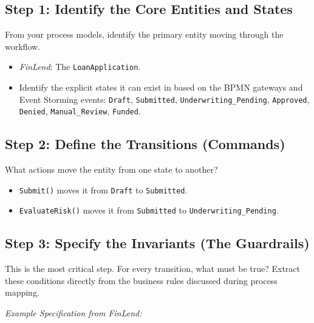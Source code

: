 \documentclass[
  11pt,
  openany,
  oneside]{book}
\providecommand{\tightlist}{%
  \setlength{\itemsep}{0pt}\setlength{\parskip}{0pt}}
\begin{document}
\subsection{Step 1: Identify the Core Entities and
States}\label{step-1-identify-the-core-entities-and-states}

From your process models, identify the primary entity moving through the
workflow.

\begin{itemize}
\tightlist
\item
  \emph{FinLend}: The \texttt{LoanApplication}.
\item
  Identify the explicit states it can exist in based on the BPMN
  gateways and Event Storming events: \texttt{Draft},
  \texttt{Submitted}, \texttt{Underwriting\_Pending}, \texttt{Approved},
  \texttt{Denied}, \texttt{Manual\_Review}, \texttt{Funded}.
\end{itemize}

\subsection{Step 2: Define the Transitions
(Commands)}\label{step-2-define-the-transitions-commands}

What actions move the entity from one state to another?

\begin{itemize}
\tightlist
\item
  \texttt{Submit()} moves it from \texttt{Draft} to \texttt{Submitted}.
\item
  \texttt{EvaluateRisk()} moves it from \texttt{Submitted} to
  \texttt{Underwriting\_Pending}.
\end{itemize}

\subsection{Step 3: Specify the Invariants (The
Guardrails)}\label{step-3-specify-the-invariants-the-guardrails}

This is the most critical step. For every transition, what must be true?
Extract these conditions directly from the business rules discussed
during process mapping.

\emph{Example Specification from FinLend:}
\end{document}
